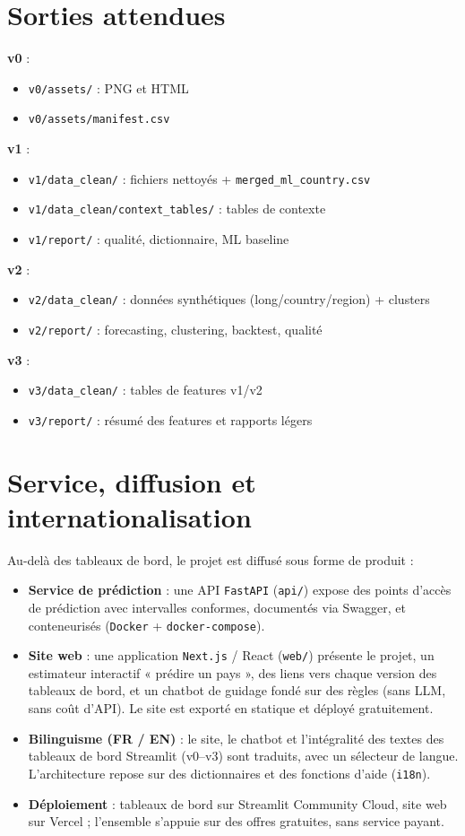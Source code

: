 \section{Sorties attendues}
\textbf{v0} :
\begin{itemize}
    \item \texttt{v0/assets/} : PNG et HTML
    \item \texttt{v0/assets/manifest.csv}
\end{itemize}

\textbf{v1} :
\begin{itemize}
    \item \texttt{v1/data\_clean/} : fichiers nettoyés + \texttt{merged\_ml\_country.csv}
    \item \texttt{v1/data\_clean/context\_tables/} : tables de contexte
    \item \texttt{v1/report/} : qualité, dictionnaire, ML baseline
\end{itemize}

\textbf{v2} :
\begin{itemize}
    \item \texttt{v2/data\_clean/} : données synthétiques (long/country/region) + clusters
    \item \texttt{v2/report/} : forecasting, clustering, backtest, qualité
\end{itemize}

\textbf{v3} :
\begin{itemize}
    \item \texttt{v3/data\_clean/} : tables de features v1/v2
    \item \texttt{v3/report/} : résumé des features et rapports légers
\end{itemize}

\section{Service, diffusion et internationalisation}
Au-delà des tableaux de bord, le projet est diffusé sous forme de produit :
\begin{itemize}
    \item \textbf{Service de prédiction} : une API \texttt{FastAPI} (\texttt{api/}) expose des points d'accès de prédiction avec intervalles conformes, documentés via Swagger, et conteneurisés (\texttt{Docker} + \texttt{docker-compose}).
    \item \textbf{Site web} : une application \texttt{Next.js} / React (\texttt{web/}) présente le projet, un estimateur interactif « prédire un pays », des liens vers chaque version des tableaux de bord, et un chatbot de guidage fondé sur des règles (sans LLM, sans coût d'API). Le site est exporté en statique et déployé gratuitement.
    \item \textbf{Bilinguisme (FR / EN)} : le site, le chatbot et l'intégralité des textes des tableaux de bord Streamlit (v0--v3) sont traduits, avec un sélecteur de langue. L'architecture repose sur des dictionnaires et des fonctions d'aide (\texttt{i18n}).
    \item \textbf{Déploiement} : tableaux de bord sur Streamlit Community Cloud, site web sur Vercel ; l'ensemble s'appuie sur des offres gratuites, sans service payant.
\end{itemize}
